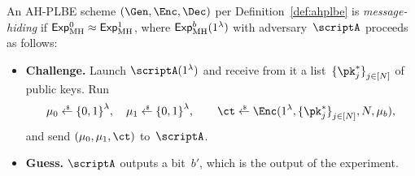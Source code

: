 \begin{definition}\label{def:ahplbe-message-hiding}
An AH-PLBE scheme $(\Gen,\Enc,\Dec)$ per Definition~\ref{def:ahplbe}
is \emph{message-hiding} if ${\ExpMH{0}\approx\ExpMH{1}}$,
where $\ExpMH{b}(1^\lambda)$ with adversary~$\scriptA$ proceeds as follows:
\begin{itemize}\upshape
\item\textbf{Challenge.}
Launch $\scriptA(1^\lambda)$ and
receive from it a list~$\{\pk^\ast_j\}_{j\in[N]}^\sphantom$ of public keys.
Run
\begin{align*}
\mu_0\draws\bit^\lambda,\quad
\mu_1\draws\bit^\lambda,\qquad
\ct\draws\Enc(1^\lambda,\{\pk^\ast_j\}_{j\in[N]}^\sphantom,N,\mu_b),
\end{align*}
and send $(\mu_0,\mu_1,\ct)$ to~$\scriptA$.
\item\textbf{Guess.}
$\scriptA$ outputs a bit~$b'$, which is the output of the experiment.
\end{itemize}
\end{definition}
